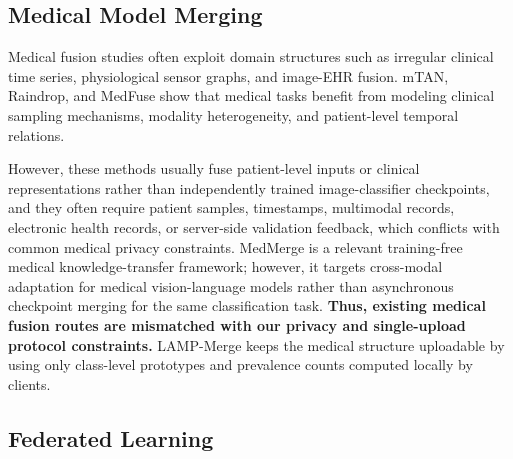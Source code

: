 \documentclass[letterpaper]{article} %
\begin{document}
\subsection{Medical Model Merging}

Medical fusion studies often exploit domain structures such as irregular clinical time series, physiological sensor graphs, and image-EHR fusion. mTAN, Raindrop, and MedFuse show that medical tasks benefit from modeling clinical sampling mechanisms, modality heterogeneity, and patient-level temporal relations\cite{shukla2021multitimeattentionnetworksirregularly,zhang2022graphguidednetworkirregularlysampled,hayat2023medfusemultimodalfusionclinical}.

However, these methods usually fuse patient-level inputs or clinical representations rather than independently trained image-classifier checkpoints, and they often require patient samples, timestamps, multimodal records, electronic health records, or server-side validation feedback, which conflicts with common medical privacy constraints\cite{kaissis2020secure,sheller2020federated,bonawitz2019towards}. MedMerge is a relevant training-free medical knowledge-transfer framework\cite{11382027}; however, it targets cross-modal adaptation for medical vision-language models rather than asynchronous checkpoint merging for the same classification task. \textbf{Thus, existing medical fusion routes are mismatched with our privacy and single-upload protocol constraints.} LAMP-Merge keeps the medical structure uploadable by using only class-level prototypes and prevalence counts computed locally by clients.

\subsection{Federated Learning}
\end{document}

